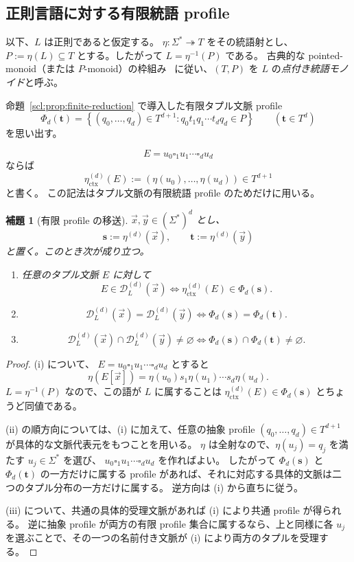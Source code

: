 \documentclass[10pt,a4paper]{ltjsarticle}
\newtheorem{lemma}[theorem]{補題}
\theoremstyle{definition}
\theoremstyle{remark}
\newcommand{\D}{\mathcal D}
\newcommand{\blank}{\square}
\begin{document}
\subsection{正則言語に対する有限統語 profile}

以下、$L$ は正則であると仮定する。
$\eta:\Sigma^*\twoheadrightarrow T$ をその統語射とし、
$P:=\eta(L)\subseteq T$
とする。したがって $L=\eta^{-1}(P)$ である。
古典的な pointed-monoid（または $P$-monoid）の枠組み~\cite{Sakarovitch1979,Pin1981} に従い、$(T,P)$ を $L$ の\emph{点付き統語モノイド}と呼ぶ。

命題~\ref{scl:prop:finite-reduction} で導入した有限タプル文脈 profile
\[
\Phi_d(\mathbf t)
=\left\{(q_0,\ldots,q_d)\in T^{d+1}:q_0t_1q_1\cdots t_dq_d\in P\right\}
\qquad(\mathbf t\in T^d)
\]
を思い出す。

\[
E=u_0\blank_1u_1\cdots\blank_du_d
\]
ならば
\[
\eta_{\mathrm{ctx}}^{(d)}(E)
:=(\eta(u_0),\ldots,\eta(u_d))\in T^{d+1}
\]
と書く。
この記法はタプル文脈の有限統語 profile のためだけに用いる。

\begin{lemma}[有限 profile の移送]
\label{alg:lem:profile}
$\vec x,\vec y\in(\Sigma^*)^d$ とし、
\[
\mathbf s:=\eta^{(d)}(\vec x),
\qquad
\mathbf t:=\eta^{(d)}(\vec y)
\]
と置く。このとき次が成り立つ。
\begin{enumerate}[label=(\roman*),leftmargin=*]
\item 任意のタプル文脈 $E$ に対して
\[
E\in\D_L^{(d)}(\vec x)
\iff
\eta_{\mathrm{ctx}}^{(d)}(E)\in\Phi_d(\mathbf s).
\]
\item
\[
\D_L^{(d)}(\vec x)=\D_L^{(d)}(\vec y)
\iff
\Phi_d(\mathbf s)=\Phi_d(\mathbf t).
\]
\item
\[
\D_L^{(d)}(\vec x)\cap\D_L^{(d)}(\vec y)\neq\varnothing
\iff
\Phi_d(\mathbf s)\cap\Phi_d(\mathbf t)\neq\varnothing.
\]
\end{enumerate}
\end{lemma}

\begin{proof}
(i) について、
$E=u_0\blank_1u_1\cdots\blank_du_d$
とすると
\[
\eta(E[\vec x])
=\eta(u_0)s_1\eta(u_1)\cdots s_d\eta(u_d).
\]
$L=\eta^{-1}(P)$ なので、この語が $L$ に属することは
$\eta_{\mathrm{ctx}}^{(d)}(E)\in\Phi_d(\mathbf s)$
とちょうど同値である。

(ii) の順方向については、(i) に加えて、任意の抽象 profile
$(q_0,\ldots,q_d)\in T^{d+1}$
が具体的な文脈代表元をもつことを用いる。
$\eta$ は全射なので、$\eta(u_j)=q_j$ を満たす $u_j\in\Sigma^*$ を選び、
$u_0\blank_1u_1\cdots\blank_du_d$
を作ればよい。
したがって $\Phi_d(\mathbf s)$ と $\Phi_d(\mathbf t)$ の一方だけに属する profile があれば、それに対応する具体的文脈は二つのタプル分布の一方だけに属する。
逆方向は (i) から直ちに従う。

(iii) について、共通の具体的受理文脈があれば (i) により共通 profile が得られる。
逆に抽象 profile が両方の有限 profile 集合に属するなら、上と同様に各 $u_j$ を選ぶことで、その一つの名前付き文脈が (i) により両方のタプルを受理する。
\end{proof}
\end{document}
